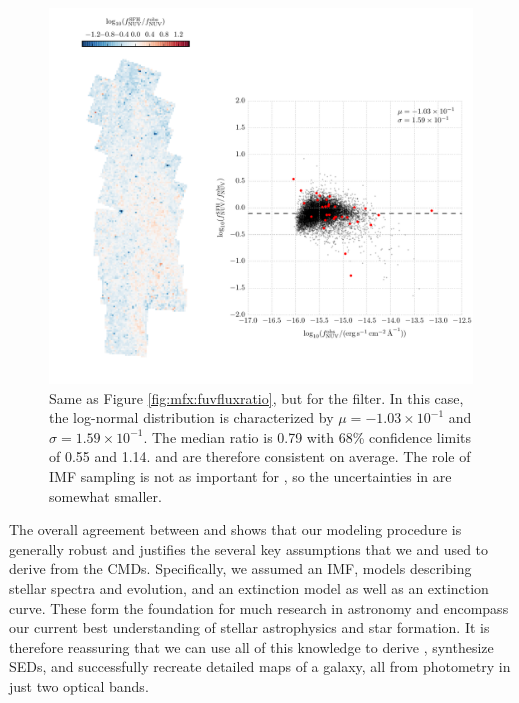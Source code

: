 \documentclass[iop, tighten]{emulateapj}
\begin{document}
\begin{figure}
\centering
\includegraphics[width=\textwidth]{m31flux-figures/flux_nuv_sfh-vs-obs.pdf}
\caption[Ratio of the synthetic flux to the observed flux in the \nuv{}
filter.]{Same as Figure \ref{fig:mfx:fuvfluxratio}, but for the \nuv{} filter.
    In this case, the log-normal distribution is characterized by $\mu =
    -1.03\times 10^{-1}$ and $\sigma = 1.59\times 10^{-1}$. The median ratio is
    0.79 with 68\% confidence limits of 0.55 and 1.14. \fnuvsfh{} and
    \fnuvobs{} are therefore consistent on average. The role of IMF sampling is
    not as important for \fnuvobs{}, so the uncertainties in \fnuvsfh{} are
    somewhat smaller.
}
\label{fig:mfx:nuvfluxratio}
\end{figure}


The overall agreement between \fxsfh{} and \fxobs{} shows that our modeling
procedure is generally robust and justifies the several key assumptions that we
and \citet{Lewis:2014} used to derive \fxsfh{} from the CMDs. Specifically, we
assumed an IMF, models describing stellar spectra and evolution, and an
extinction model as well as an extinction curve. These form the foundation for
much research in astronomy and encompass our current best understanding of
stellar astrophysics and star formation. It is therefore reassuring that we can
use all of this knowledge to derive , synthesize SEDs, and successfully
recreate detailed maps of a galaxy, all from photometry in just two optical
bands.
\end{document}
